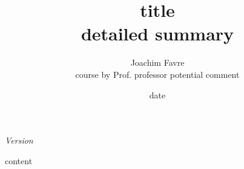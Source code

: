 \documentclass[a4paper]{article}
\title{{title}\\ {detailed summary}}
\author{Joachim Favre\\ {course by} Prof. {professor} {potential comment}}
\date{{date}}
\begin{document}
\maketitle

\setcounter{tocdepth}{5}

\tableofcontents

\initcurrdate
\def\setdateformat{Y--m--d}
\vspace*{\fill}
\vspace*{\fill}
\vspace*{\fill}
\vspace*{\fill}
\vspace*{\fill}
\vspace*{\fill}
\vspace*{\fill}
\vspace*{\fill}
\begin{center}
\textit{Version }
\end{center}
\vspace*{\fill}

\newpage

{content}
\end{document}

